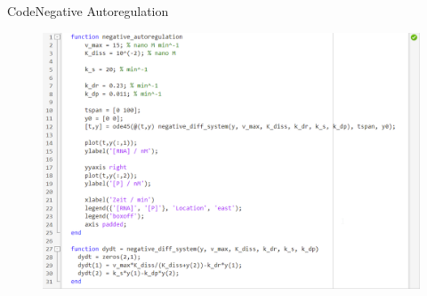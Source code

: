 \documentclass[11pt,aspectratio=169,reqno]{beamer}
\begin{document}
\begin{frame}[fragile]{Code\hfill {\small \textcolor{ETHBlue}{Negative Autoregulation}}}
    \begin{figure}
        \centering
        \includegraphics[height=.8\textheight]{images/code.png}
    \end{figure}
\end{frame}
\end{document}
